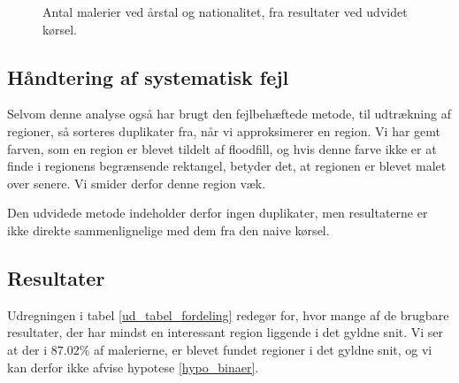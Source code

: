 {\begin{figure}[!h]
    \centering
    \hspace{1em}
    \caption[]{Antal malerier ved årstal og nationalitet, fra resultater
    ved udvidet kørsel.}
    \label{ud_year_nation}
\end{figure}

\subsection{Håndtering af systematisk fejl}
Selvom denne analyse også har brugt den fejlbehæftede metode, til
udtrækning af regioner, så sorteres duplikater fra, når vi approksimerer
en region. Vi har gemt farven, som en region er blevet tildelt af
floodfill, og hvis denne farve ikke er at finde i regionens begrænsende
rektangel, betyder det, at regionen er blevet malet over senere. Vi
smider derfor denne region væk.

Den udvidede metode indeholder derfor ingen duplikater, men resultaterne
er ikke direkte sammenlignelige med dem fra den naive kørsel.

\subsection{Resultater}
Udregningen i tabel \ref{ud_tabel_fordeling} redegør for, hvor mange af
de brugbare resultater, der har mindst en interessant region liggende i
det gyldne snit. Vi ser at der i $87.02\%$ af malerierne, er blevet
fundet regioner i det gyldne snit, og vi kan derfor ikke afvise hypotese
\ref{hypo_binaer}.

}
